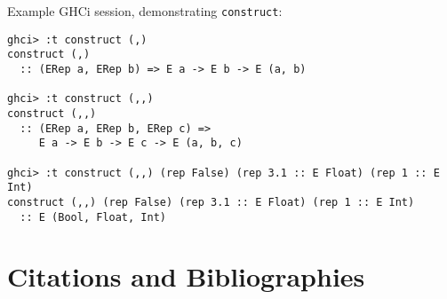 \documentclass[acmsmall]{acmart}
\newcommand{\ttt}{\texttt}
\providecommand\BibTeX{{%
    \normalfont B\kern-0.5em{\scshape i\kern-0.25em b}\kern-0.8em\TeX}}}
\begin{document}
Example GHCi session, demonstrating \ttt{construct}:

\begin{lstlisting}
ghci> :t construct (,)
construct (,)
  :: (ERep a, ERep b) => E a -> E b -> E (a, b)

ghci> :t construct (,,)
construct (,,)
  :: (ERep a, ERep b, ERep c) =>
     E a -> E b -> E c -> E (a, b, c)

ghci> :t construct (,,) (rep False) (rep 3.1 :: E Float) (rep 1 :: E Int)
construct (,,) (rep False) (rep 3.1 :: E Float) (rep 1 :: E Int)
  :: E (Bool, Float, Int)
\end{lstlisting}


\section{Citations and Bibliographies}


%   
%   

\end{document}
